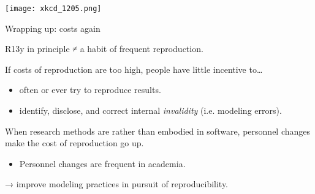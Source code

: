 \documentclass[12pt,aspectratio=169]{beamer}
\begin{document}
\begin{frame}[plain]
  \centering
  \texttt{[image: xkcd\_1205.png]}
\end{frame}

\begin{frame}{Wrapping up: costs again}

R13y in principle ≠ a habit of frequent reproduction.

If costs of reproduction are too high, people have little incentive to…
\begin{itemize}
  \item often or ever try to reproduce results.

  \item identify, disclose, and correct internal \emph{invalidity} (i.e. modeling errors).
\end{itemize}

\bigskip
When research methods are  rather than embodied in software, personnel changes make the cost of reproduction go up.

\begin{itemize}
  \item Personnel changes are frequent in academia.
\end{itemize}

\bigskip
{} → improve modeling practices in pursuit of reproducibility.

\end{frame}
\end{document}
